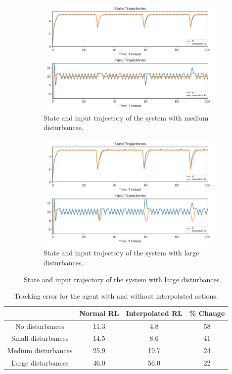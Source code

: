 \begin{figure}[H]
     \centering
     \begin{subfigure}{0.49\textwidth}
         \centering
         \includegraphics[width=\textwidth]{images/ch4/medium_dist.png}
         \caption{State and input trajectory of the system with medium disturbances.}
         \label{fig:04med_dist}
     \end{subfigure}
     \hfill
     \begin{subfigure}{0.49\textwidth}
         \centering
         \includegraphics[width=\textwidth]{images/ch4/big_dist.png}
         \caption{State and input trajectory of the system with large disturbances.}
         \label{fig:04big_dist}
     \end{subfigure}
\end{figure}

\begin{table}[H]
\caption{Tracking error for the agent with and without interpolated actions.}
\label{tab:04rl_inter_vs_norm}
\centering
\begin{tabular}{c|c|c|c}
& \textbf{Normal RL}    & \textbf{Interpolated RL}  &  \textbf{\% Change}\\
\hline
No disturbances	        & 11.3 & 4.8 & 58		 \\
Small disturbances      & 14.5 & 8.6 & 41		\\
Medium disturbances     & 25.9 & 19.7 & 24		\\
Large disturbances		& 46.0 & 56.0 & 22		 
\end{tabular}
\end{table}






